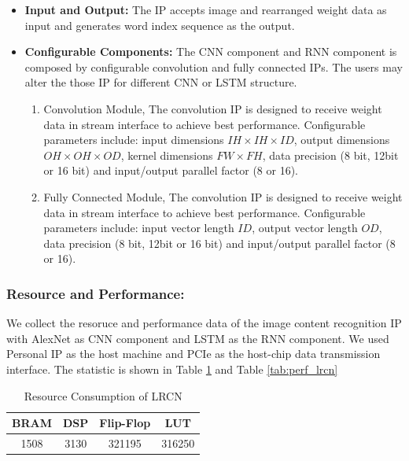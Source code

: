 \documentclass[a4paper, 11pt]{article}
\begin{document}
\begin{itemize}
    \item {
\textbf{Input and Output:} The IP accepts image and rearranged weight data as input and generates word index sequence as the output.
    }
    \item {
\textbf{Configurable Components:} 
The CNN component and RNN component is composed by configurable convolution and fully connected IPs. The users may alter the those IP for different CNN or LSTM structure.

\begin{enumerate}
    \item {
    Convolution Module, The convolution IP is designed to receive weight data in stream interface to achieve best performance. Configurable parameters include: input dimensions $IH \times IH\times ID$, output dimensions $OH \times OH\times OD$, kernel dimensions $FW \times FH $, data precision (8 bit, 12bit or 16 bit) and input/output parallel factor (8 or 16).
    }
    \item {
    Fully Connected Module, The convolution IP is designed to receive weight data in stream interface to achieve best performance. Configurable parameters include: input vector length $ID$, output vector length $OD$, data precision (8 bit, 12bit or 16 bit) and input/output parallel factor (8 or 16).
    }
\end{enumerate}
    }
    
\end{itemize}

\subsubsection{Resource and Performance:} 
We collect the resoruce and performance data of the image content recognition IP with AlexNet as CNN component and LSTM as the RNN component. We used Personal IP as the host machine and PCIe as the host-chip data transmission interface. The statistic is shown in Table \ref{tab:resourec_lrcn} and Table \ref{tab:perf_lrcn}

\begin{table}[h]
\centering
\caption{Resource Consumption of LRCN\vspace{-10pt}} \label{tab:resourec_lrcn}
\setlength{\tabcolsep}{4pt}
\begin{tabular}{|c | c |  c| c|}
\hline 
BRAM & DSP & Flip-Flop & LUT \\
\hline
1508 & 3130 & 321195 & 316250 \\
\hline
\end{tabular}
\end{table}
\end{document}
